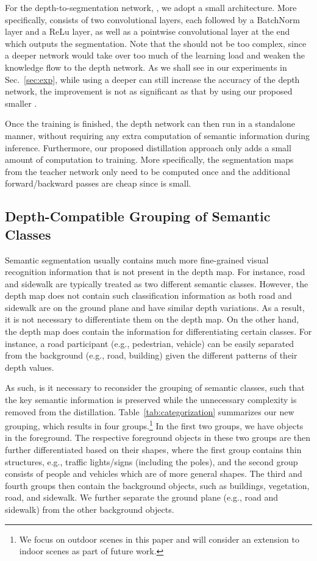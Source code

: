 \documentclass{bmvc2k}
\begin{document}
For the depth-to-segmentation network, , we adopt a small architecture. More specifically,  consists of two  convolutional layers, each followed by a BatchNorm layer and a ReLu layer, as well as a pointwise convolutional layer at the end which outputs the segmentation. Note that the  should not be too complex, since a deeper network would take over too much of the learning load and weaken the knowledge flow to the depth network. As we shall see in our experiments in Sec.~\ref{sec:exp}, while using a deeper  can still increase the accuracy of the depth network, the improvement is not as significant as that by using our proposed smaller .  

Once the training is finished, the depth network can then run in a standalone manner, without requiring any extra computation of semantic information during inference. Furthermore, our proposed distillation approach only adds a small amount of computation to training. More specifically, the segmentation maps from the teacher network only need to be computed once and the additional forward/backward passes are cheap since  is small.

\vspace{-5pt}
\subsection{Depth-Compatible Grouping of Semantic Classes}\label{sec:regroup}
\vspace{-5pt}
Semantic segmentation usually contains much more fine-grained visual recognition information that is not present in the depth map. For instance, road and sidewalk are typically treated as two different semantic classes. However, the depth map does not contain such classification information as both road and sidewalk are on the ground plane and have similar depth variations. As a result, it is not necessary to differentiate them on the depth map. On the other hand, the depth map does contain the information for differentiating certain classes. For instance, a road participant (e.g., pedestrian, vehicle) can be easily separated from the background (e.g., road, building) given the different patterns of their depth values.

As such, is it necessary to reconsider the grouping of semantic classes, such that the key semantic information is preserved while the unnecessary complexity is removed from the distillation. Table~\ref{tab:categorization} summarizes our new grouping, which results in four groups.\footnote{We focus on outdoor scenes in this paper and will consider an extension to indoor scenes as part of future work.} In the first two groups, we have objects in the foreground. The respective foreground objects in these two groups are then further differentiated based on their shapes, where the first group contains thin structures, e.g., traffic lights/signs (including the poles), and the second group consists of people and vehicles which are of more general shapes. The third and fourth groups then contain the background objects, such as buildings, vegetation, road, and sidewalk. We further separate the ground plane (e.g., road and sidewalk) from the other background objects.
\end{document}
